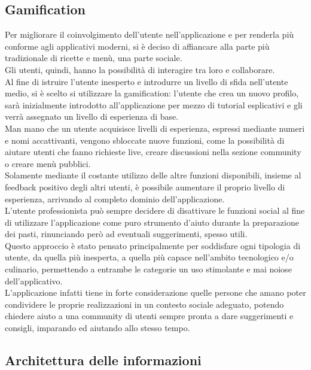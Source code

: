 \subsection{Gamification}
Per migliorare il coinvolgimento dell'utente nell'applicazione e per renderla più conforme agli applicativi moderni, si è deciso di affiancare alla parte più tradizionale di ricette e menù, una parte sociale.\\
Gli utenti, quindi, hanno la possibilità di interagire tra loro e collaborare.\\
Al fine di istruire l'utente inesperto e introdurre un livello di sfida nell'utente medio, si è scelto si utilizzare la gamification:
l'utente che crea un nuovo profilo, sarà inizialmente introdotto all'applicazione per mezzo di tutorial esplicativi e gli verrà assegnato un livello di esperienza di base.\\
Man mano che un utente acquisisce livelli di esperienza, espressi mediante numeri e nomi accattivanti, vengono sbloccate nuove funzioni, come la possibilità di aiutare utenti che fanno richieste live, creare discussioni nella sezione community o creare menù pubblici.\\
Solamente mediante il costante utilizzo delle altre funzioni disponibili, insieme al feedback positivo degli altri utenti, è possibile aumentare il proprio livello di esperienza, arrivando al completo dominio dell'applicazione.\\
L'utente professionista può sempre decidere di disattivare le funzioni social al fine di utilizzare l'applicazione come puro strumento d'aiuto durante la preparazione dei pasti, rinunciando però ad eventuali suggerimenti, spesso utili.\\
Questo approccio è stato pensato principalmente per soddisfare ogni tipologia di utente, da quella più inesperta, a quella più capace nell'ambito tecnologico e/o culinario, permettendo a entrambe le categorie un uso stimolante e mai noiose dell'applicativo.\\
L’applicazione infatti tiene in forte considerazione quelle persone che amano poter condividere le proprie realizzazioni in un contesto sociale adeguato, potendo chiedere aiuto a una community di utenti sempre pronta a dare suggerimenti e consigli, imparando ed aiutando allo stesso tempo.


\subsection{Architettura delle informazioni}